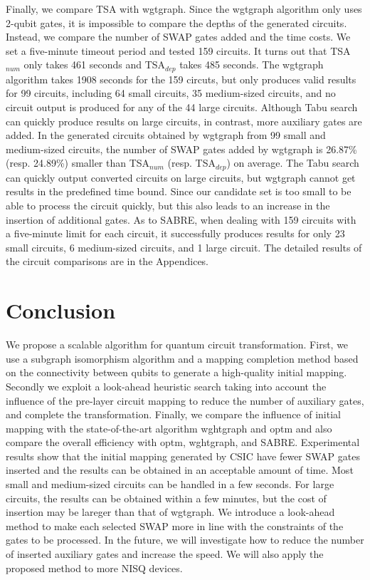 \documentclass[journal]{IEEEtran}
\begin{document}
	Finally, we compare TSA with wgtgraph.  Since the wgtgraph algorithm only uses 2-qubit gates, 
	it is impossible to compare the depths of the generated circuits.  Instead, we compare the number of SWAP gates added and the time costs. 
  We set a five-minute timeout period and tested 159 circuits. It turns out that TSA$_{num}$ only takes 461 seconds and TSA$_{dep}$ takes 485 seconds. The  wgtgraph algorithm takes 1908 seconds for the 159 circuts,  but only produces valid results for 99 circuits, including 64 small circuits,  35 medium-sized circuits,  and no circuit output is produced for any of the 44 large circuits. Although Tabu search can quickly produce results on large circuits, in contrast,  more auxiliary gates are added.  In the generated circuits obtained by wgtgraph from  99 small and medium-sized circuits,  the number of SWAP gates added by wgtgraph is 26.87\% (resp. 24.89\%) smaller than TSA$_{num}$ (resp. TSA$_{dep}$) on average. The Tabu search can quickly output converted circuits on large circuits, but wgtgraph cannot get results in the predefined time bound. Since  our candidate set is too small to be able to process the circuit quickly, but this also leads to an increase in the insertion of additional gates. As to SABRE, when dealing with 159 circuits with a five-minute limit for each circuit, it successfully produces results for only 23 small circuits, 6 medium-sized circuits, and 1 large circuit. The detailed results of the circuit comparisons are in the Appendices. 
  
  \section{Conclusion}
  \label{Conclusion}
  We propose a scalable algorithm for quantum circuit transformation. First, we use a subgraph isomorphism algorithm and a mapping completion method based on the connectivity between qubits to generate a high-quality initial mapping. Secondly we exploit a look-ahead heuristic search taking into account the influence of the pre-layer circuit mapping to reduce the number of auxiliary gates, and complete the transformation. Finally, we compare the influence of initial mapping  with the state-of-the-art algorithm wghtgraph and optm and also compare the overall efficiency with optm, wghtgraph, and SABRE.
  Experimental results show that the initial mapping generated by CSIC have fewer SWAP gates inserted and the results can be obtained in an acceptable amount of time. Most small and medium-sized circuits can be handled in a few seconds.
  For large circuits, the results can be obtained within a few minutes,
  but the cost of insertion may be lareger than that of wgtgraph.
  We introduce a look-ahead method to make each selected SWAP more in line with the constraints of the gates to be processed.
  In the future, we will investigate how to reduce the number of inserted auxiliary gates  and increase the speed. We will also apply the proposed method to more NISQ devices.
\end{document}
